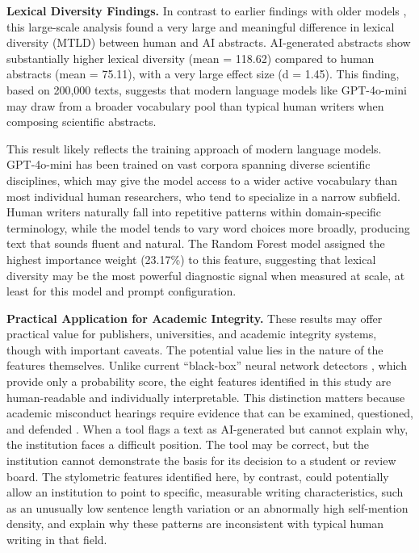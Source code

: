 \documentclass{article}
\begin{document}
\textbf{Lexical Diversity Findings.} In contrast to earlier findings with older models \cite{ref5}, this large-scale analysis found a very large and meaningful difference in lexical diversity (MTLD) between human and AI abstracts. AI-generated abstracts show substantially higher lexical diversity (mean = 118.62) compared to human abstracts (mean = 75.11), with a very large effect size (d = 1.45). This finding, based on 200,000 texts, suggests that modern language models like GPT-4o-mini may draw from a broader vocabulary pool than typical human writers when composing scientific abstracts.

This result likely reflects the training approach of modern language models. GPT-4o-mini has been trained on vast corpora spanning diverse scientific disciplines, which may give the model access to a wider active vocabulary than most individual human researchers, who tend to specialize in a narrow subfield. Human writers naturally fall into repetitive patterns within domain-specific terminology, while the model tends to vary word choices more broadly, producing text that sounds fluent and natural. The Random Forest model assigned the highest importance weight (23.17\%) to this feature, suggesting that lexical diversity may be the most powerful diagnostic signal when measured at scale, at least for this model and prompt configuration.

\textbf{Practical Application for Academic Integrity.} These results may offer practical value for publishers, universities, and academic integrity systems, though with important caveats. The potential value lies in the nature of the features themselves. Unlike current ``black-box'' neural network detectors \cite{ref5,ref6}, which provide only a probability score, the eight features identified in this study are human-readable and individually interpretable. This distinction matters because academic misconduct hearings require evidence that can be examined, questioned, and defended \cite{ref6}. When a tool flags a text as AI-generated but cannot explain why, the institution faces a difficult position. The tool may be correct, but the institution cannot demonstrate the basis for its decision to a student or review board. The stylometric features identified here, by contrast, could potentially allow an institution to point to specific, measurable writing characteristics, such as an unusually low sentence length variation or an abnormally high self-mention density, and explain why these patterns are inconsistent with typical human writing in that field.
\end{document}
